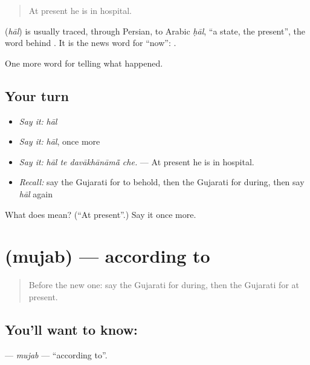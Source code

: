 \begin{quote}
At present he is in hospital.
\end{quote}

\begin{cousinweb}
\textbf{} (\emph{hāl}) is usually traced, through Persian, to Arabic \emph{ḥāl}, \textquotedblleft{}a state, the present\textquotedblright{}, the word behind \textbf{}. It is the news word for \textquotedblleft{}now\textquotedblright{}: \textbf{   }.
\end{cousinweb}

\begin{grammarlens}[title={What you've built}]
One more word for telling what happened.
\end{grammarlens}

\subsection*{Your turn}
\begin{itemize}
\raggedright
  \item \emph{Say it:} \emph{hāl}
  \item \emph{Say it:} \emph{hāl}, once more
  \item \emph{Say it:} \emph{hāl te davākhānāmā̃ che.} — At present he is in hospital.
  \item \emph{Recall:} say the Gujarati for to behold, then the Gujarati for during, then say \emph{hāl} again
\end{itemize}

\begin{tcolorbox}[breakable,colback=teal!4,colframe=teal!35!black,title={Before you move on}]
What does  mean? (\textquotedblleft{}At present\textquotedblright{}.) Say it once more.
\end{tcolorbox}
\section[\texorpdfstring{\gu{મુજબ} (mujab)}{મુજબ (mujab)}]{ (mujab) — according to}

\label{lesson:GU-C316-mujab}



\begin{quote}
Before the new one: say the Gujarati for during, then the Gujarati for at present.
\end{quote}

\subsection*{You'll want to know: }
\textbf{} — \emph{mujab} — \textquotedblleft{}according to\textquotedblright{}.

